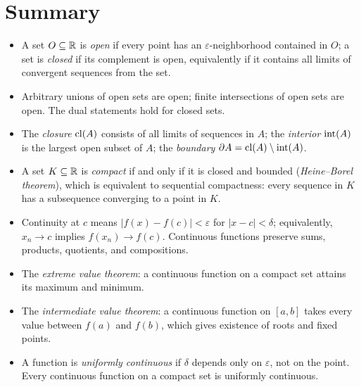 \documentclass[11pt,a4paper]{article}
\begin{document}
\section{Summary}
\label{sec:summary}

\begin{itemize}
  \item A set $O \subseteq \mathbb{R}$ is \emph{open} if every point has an
    $\varepsilon$-neighborhood contained in $O$; a set is \emph{closed}
    if its complement is open, equivalently if it contains all limits of
    convergent sequences from the set.

  \item Arbitrary unions of open sets are open; finite intersections of
    open sets are open. The dual statements hold for closed sets.

  \item The \emph{closure} $\operatorname{cl}(A)$ consists of all limits of sequences
    in $A$; the \emph{interior} $\operatorname{int}(A)$ is the largest open
    subset of $A$; the \emph{boundary} $\partial A = \operatorname{cl}(A) \setminus
    \operatorname{int}(A)$.

  \item A set $K \subseteq \mathbb{R}$ is \emph{compact} if and only if it is
    closed and bounded (\emph{Heine--Borel theorem}), which is
    equivalent to sequential compactness: every sequence in $K$ has a
    subsequence converging to a point in $K$.

  \item Continuity at $c$ means $|f(x) - f(c)| < \varepsilon$ for
    $|x - c| < \delta$; equivalently, $x_n \to c$ implies
    $f(x_n) \to f(c)$. Continuous functions preserve sums, products,
    quotients, and compositions.

  \item The \emph{extreme value theorem}: a continuous function on a
    compact set attains its maximum and minimum.

  \item The \emph{intermediate value theorem}: a continuous function on
    $[a,b]$ takes every value between $f(a)$ and $f(b)$, which gives
    existence of roots and fixed points.

  \item A function is \emph{uniformly continuous} if $\delta$ depends
    only on $\varepsilon$, not on the point. Every continuous function
    on a compact set is uniformly continuous.
\end{itemize}
\end{document}
